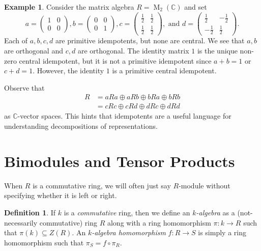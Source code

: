 \documentclass[12pt]{article}
\theoremstyle{plain}
\theoremstyle{definition}
\newtheorem{definition}[theorem]{Definition}
\newtheorem{example}[theorem]{Example}
\theoremstyle{remark}
\numberwithin{equation}{section}
\begin{document}
\begin{example}
Consider the matrix algebra $R=\operatorname{M}_2(\mathbb{C})$
and set
\[
a = \begin{pmatrix} 1 & 0 \\ 0 & 0 \end{pmatrix},
b = \begin{pmatrix} 0 & 0 \\ 0 & 1 \end{pmatrix},
c = \begin{pmatrix} \frac{1}{2} & \frac{1}{2} \\ \frac{1}{2} & \frac{1}{2} \end{pmatrix},
\textrm{ and }
d = \begin{pmatrix} \frac{1}{2} & -\frac{1}{2} \\ -\frac{1}{2} &
\frac{1}{2} \end{pmatrix}.
\]
Each of $a,b,c,d$ are primitive idempotents, but none are central.
We see that $a,b$ are orthogonal and $c,d$ are orthogonal.
The identity matrix $1$ is the unique non-zero central idempotent,
but it is not a primitive idempotent since $a+b=1$ or $c+d=1$.
However, the identity $1$ is a primitive central idempotent.

Observe that
\begin{align*}
R &= aRa \oplus aRb \oplus bRa \oplus bRb\\
&= cRc \oplus cRd \oplus dRc \oplus dRd
\end{align*}
as $\mathbb{C}$-vector spaces.
This hints that idempotents are a useful
language for understanding decompositions of representations.
\end{example}

\section{Bimodules and Tensor Products}

When $R$ is a commutative ring, we will often just say $R$-module without
specifying whether it is left or right.

\begin{definition}
If $k$ is a \emph{commutative} ring, then we define an
\emph{$k$-algebra} as a (not-necessarily commutative) ring $R$ along
with a ring homomorphism $\pi : k \to R$ such that $\pi(k) \subseteq Z(R)$.
An \emph{$k$-algebra homomorphism} $f : R \to S$ is simply a ring
homomorphism such that $\pi_S = f \circ \pi_R$.
\end{definition}
\end{document}
